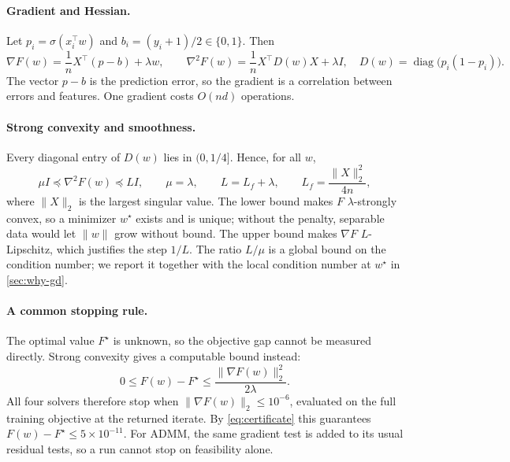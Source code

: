 \documentclass{article}
\newcommand{\gradnorm}{\|\nabla F(w)\|_2}
\begin{document}
\paragraph{Gradient and Hessian.}
Let $p_i=\sigma(x_i^\top w)$ and $b_i=(y_i+1)/2\in\{0,1\}$. Then
\begin{equation}
\label{eq:grad}
\nabla F(w)=\frac1n X^\top(p-b)+\lambda w,\qquad
\nabla^2F(w)=\frac1n X^\top D(w)X+\lambda I,\quad D(w)=\operatorname{diag}\bigl(p_i(1-p_i)\bigr).
\end{equation}
The vector $p-b$ is the prediction error, so the gradient is a correlation between errors and features. One gradient costs $O(nd)$ operations.

\paragraph{Strong convexity and smoothness.}
Every diagonal entry of $D(w)$ lies in $(0,1/4]$. Hence, for all $w$,
\begin{equation}
\label{eq:bounds}
\mu I\preceq \nabla^2F(w)\preceq L I,\qquad
\mu=\lambda,\qquad L=L_f+\lambda,\qquad L_f=\frac{\|X\|_2^2}{4n},
\end{equation}
where $\|X\|_2$ is the largest singular value. The lower bound makes $F$ $\lambda$-strongly convex, so a minimizer $w^\star$ exists and is unique; without the penalty, separable data would let $\|w\|$ grow without bound. The upper bound makes $\nabla F$ $L$-Lipschitz, which justifies the step $1/L$. The ratio $L/\mu$ is a global bound on the condition number; we report it together with the local condition number at $w^\star$ in \cref{sec:why-gd}.

\paragraph{A common stopping rule.}
The optimal value $F^\star$ is unknown, so the objective gap cannot be measured directly. Strong convexity gives a computable bound instead:
\begin{equation}
\label{eq:certificate}
0\le F(w)-F^\star\le \frac{\|\nabla F(w)\|_2^2}{2\lambda}.
\end{equation}
All four solvers therefore stop when $\gradnorm\le 10^{-6}$, evaluated on the full training objective at the returned iterate. By \eqref{eq:certificate} this guarantees $F(w)-F^\star\le 5\times10^{-11}$. For ADMM, the same gradient test is added to its usual residual tests, so a run cannot stop on feasibility alone.
\end{document}
